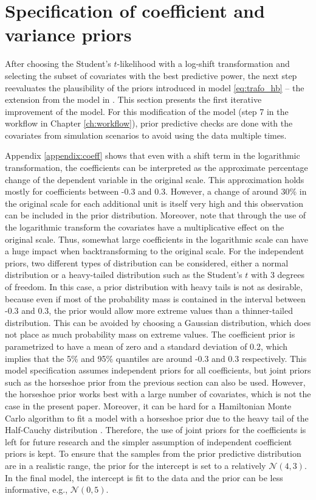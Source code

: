 \section{Specification of coefficient and variance priors}
\label{ch:coef_var_spec}

After choosing the Student's $t$-likelihood with a log-shift transformation and selecting the subset of covariates with the best predictive power, the next step reevaluates the plausibility of the priors introduced in model \ref{eq:trafo_hb} – the extension from the model in \cite{morelli_hierarchical_2021}.
This section presents the first iterative improvement of the model.
For this modification of the model (step 7 in the workflow in Chapter \ref{ch:workflow}), prior predictive checks are done with the covariates from simulation scenarios to avoid using the data multiple times.

Appendix \ref{appendix:coeff} shows that even with a shift term in the logarithmic transformation, the coefficients can be interpreted as the approximate percentage change of the dependent variable in the original scale.
This approximation holds mostly for coefficients between -0.3 and 0.3.
However, a change of around 30\% in the original scale for each additional unit is itself very high and this observation can be included in the prior distribution.
Moreover, note that through the use of the logarithmic transform the covariates have a multiplicative effect on the original scale.
Thus, somewhat large coefficients in the logarithmic scale can have a huge impact when backtransforming to the original scale.
For the independent priors, two different types of distribution can be considered, either a normal distribution or a heavy-tailed distribution such as the Student's $t$ with 3 degrees of freedom.
In this case, a prior distribution with heavy tails is not as desirable, because even if most of the probability mass is contained in the interval between -0.3 and 0.3, the prior would allow more extreme values than a thinner-tailed distribution.
This can be avoided by choosing a Gaussian distribution, which does not place as much probability mass on extreme values.
The coefficient prior is parametrized to have a mean of zero and a standard deviation of 0.2, which implies that the 5\% and 95\% quantiles are around -0.3 and 0.3 respectively.
This model specification assumes independent priors for all coefficients, but joint priors such as the horseshoe prior from the previous section can also be used.
However, the horseshoe prior works best with a large number of covariates, which is not the case in the present paper.
Moreover, it can be hard for a Hamiltonian Monte Carlo algorithm to fit a model with a horseshoe prior due to the heavy tail of the Half-Cauchy distribution \citep{betancourt_conceptual_2017}.
Therefore, the use of joint priors for the coefficients is left for future research and the simpler assumption of independent coefficient priors is kept.
To ensure that the samples from the prior predictive distribution are in a realistic range, the prior for the intercept is set to a relatively $\mathcal N (4, 3)$.
In the final model, the intercept is fit to the data and the prior can be less informative, e.g., $\mathcal N(0, 5)$.

